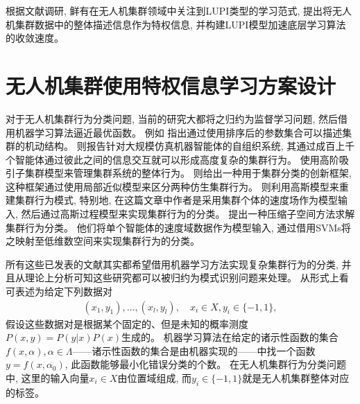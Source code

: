 根据文献调研, 鲜有在无人机集群领域中关注到LUPI类型的学习范式, 提出将无人机集群数据中的整体描述信息作为特权信息, 并构建LUPI模型加速底层学习算法的收敛速度。

\section{无人机集群使用特权信息学习方案设计}
\label{sec:swarm-behavior-empirical}

对于无人机集群行为分类问题, 当前的研究大都将之归约为监督学习问题, 然后借用机器学习算法逼近最优函数。 例如\citet{Tunstrm2013} 指出通过使用排序后的参数集合可以描述集群的机动结构。 \citet{Michael2014} 则报告针对大规模仿真机器智能体的自组织系统, 其通过成百上千个智能体通过彼此之间的信息交互就可以形成高度复杂的集群行为。 \citet{Brown-Human-swarm2014} 使用高阶吸引子集群模型来管理集群系统的整体行为。\citet{Brown2014} 则给出一种用于集群分类的创新框架, 这种框架通过使用局部近似模型来区分两种仿生集群行为。 \citet{Walker2014}则利用高斯模型来重建集群行为模式, 特别地, 在这篇文章中作者是采用集群个体的速度场作为模型输入, 然后通过高斯过程模型来实现集群行为的分类。\citet{Berger2016} 提出一种压缩子空间方法求解集群行为分类。 他们将单个智能体的速度域数据作为模型输入, 通过借用SVMs将之映射至低维数空间来实现集群行为的分类。

所有这些已发表的文献其实都希望借用机器学习方法实现复杂集群行为的分类, 并且从理论上分析可知这些研究都可以被归约为模式识别问题来处理。 从形式上看可表述为给定下列数据对 
\begin{align}
(x_{1}, y_{1}), \ldots, (x_{l}, y_{l}), \quad x_{i} \in X, y_{i} \in \{-1, 1\},
\end{align}
假设这些数据对是根据某个固定的、但是未知的概率测度$P(x,y) = P(y|x)P(x)$生成的。 机器学习算法在给定的诸示性函数的集合$f(x,\alpha), \alpha \in \Lambda$——诸示性函数的集合是由机器实现的——中找一个函数$y = f(x, \alpha_{0})$, 此函数能够最小化错误分类的个数。 在无人机集群行为分类问题中, 这里的输入向量$x_{i} \in X$由位置域组成, 而$y_{i} \in \{-1, 1\}$就是无人机集群整体对应的标签。

